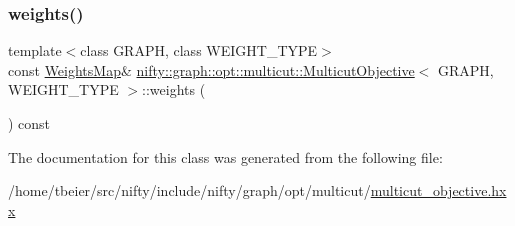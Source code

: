 \mbox{\label{classnifty_1_1graph_1_1opt_1_1multicut_1_1MulticutObjective_a3f97ef87873adce4123c49c87a9ecc6f}} 
\subsubsection{\texorpdfstring{weights()}{weights()}\hspace{0.1cm}{\footnotesize\ttfamily [2/2]}}
{\footnotesize\ttfamily template$<$class G\+R\+A\+PH, class W\+E\+I\+G\+H\+T\+\_\+\+T\+Y\+PE$>$ \\
const \hyperlink{classnifty_1_1graph_1_1opt_1_1multicut_1_1MulticutObjective_aa893b1c13cb7add0c87445a1ed24d214}{Weights\+Map}\& \hyperlink{classnifty_1_1graph_1_1opt_1_1multicut_1_1MulticutObjective}{nifty\+::graph\+::opt\+::multicut\+::\+Multicut\+Objective}$<$ G\+R\+A\+PH, W\+E\+I\+G\+H\+T\+\_\+\+T\+Y\+PE $>$\+::weights (\begin{DoxyParamCaption}{ }\end{DoxyParamCaption}) const\hspace{0.3cm}{\ttfamily [inline]}}



The documentation for this class was generated from the following file\+:\begin{DoxyCompactItemize}
\item 
/home/tbeier/src/nifty/include/nifty/graph/opt/multicut/\hyperlink{graph_2opt_2multicut_2multicut__objective_8hxx}{multicut\+\_\+objective.\+hxx}\end{DoxyCompactItemize}
